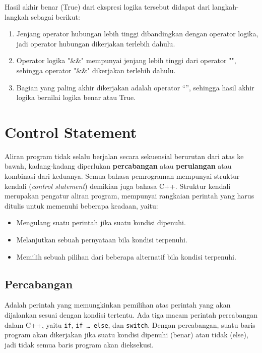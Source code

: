 Hasil akhir benar (True) dari ekspresi logika tersebut didapat dari
langkah-langkah sebagai berikut:

\begin{enumerate}


\item
  Jenjang operator hubungan lebih tinggi dibandingkan dengan operator
  logika, jadi operator hubungan dikerjakan terlebih dahulu.
\item
  Operator logika "\&\&" mempunyai jenjang lebih tinggi dari operator
  "\textbar{}\textbar{}", sehingga operator "\&\&" dikerjakan
  terlebih dahulu.
\item
  Bagian yang paling akhir dikerjakan adalah operator
  ``\textbar{}\textbar{}'', sehingga hasil akhir logika bernilai logika
  benar atau True.
\end{enumerate}

\section{Control Statement}\label{control-statement}

Aliran program tidak selalu berjalan secara sekuensial berurutan dari
atas ke bawah, kadang-kadang diperlukan \textbf{percabangan} atau
\textbf{perulangan} atau kombinasi dari keduanya. Semua bahasa
pemrograman mempunyai struktur kendali (\emph{control statement})
demikian juga bahasa C++. Struktur kendali merupakan pengatur aliran
program, mempunyai rangkaian perintah yang harus ditulis untuk memenuhi
beberapa keadaan, yaitu:

\begin{itemize}

\item
  Mengulang suatu perintah jika suatu kondisi dipenuhi.
\item
  Melanjutkan sebuah pernyataan bila kondisi terpenuhi.
\item
  Memilih sebuah pilihan dari beberapa alternatif bila kondisi
  terpenuhi.
\end{itemize}

\subsection{Percabangan}\label{a.-percabangan}

Adalah perintah yang memungkinkan pemilihan atas perintah yang akan
dijalankan sesuai dengan kondisi tertentu. Ada tiga macam perintah
percabangan dalam C++, yaitu \texttt{if}, \texttt{if\ \ldots{}\ else},
dan \texttt{switch}. Dengan percabangan, suatu baris program akan
dikerjakan jika suatu kondisi dipenuhi (benar) atau tidak (else), jadi
tidak semua baris program akan dieksekusi.

